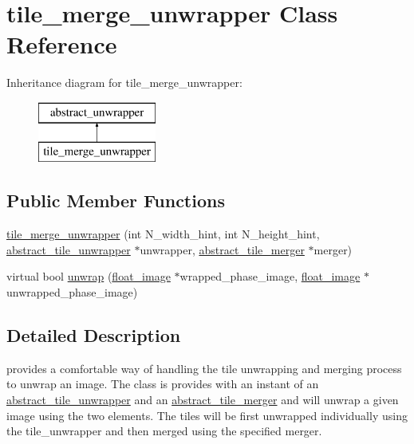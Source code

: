 \hypertarget{classtile__merge__unwrapper}{\section{tile\-\_\-merge\-\_\-unwrapper Class Reference}
\label{classtile__merge__unwrapper}
}
Inheritance diagram for tile\-\_\-merge\-\_\-unwrapper\-:\begin{figure}[H]
\begin{center}
\leavevmode
\includegraphics[height=2.000000cm]{classtile__merge__unwrapper}
\end{center}
\end{figure}
\subsection*{Public Member Functions}
\begin{DoxyCompactItemize}
\item 
\hyperlink{classtile__merge__unwrapper_ab070881e616ad7e72398aa6d019ea60e}{tile\-\_\-merge\-\_\-unwrapper} (int N\-\_\-width\-\_\-hint, int N\-\_\-height\-\_\-hint, \hyperlink{classabstract__tile__unwrapper}{abstract\-\_\-tile\-\_\-unwrapper} $\ast$unwrapper, \hyperlink{classabstract__tile__merger}{abstract\-\_\-tile\-\_\-merger} $\ast$merger)
\item 
virtual bool \hyperlink{classtile__merge__unwrapper_a30e5ac52c9edcd0356a37565fd955f6f}{unwrap} (\hyperlink{classfloat__image}{float\-\_\-image} $\ast$wrapped\-\_\-phase\-\_\-image, \hyperlink{classfloat__image}{float\-\_\-image} $\ast$unwrapped\-\_\-phase\-\_\-image)
\end{DoxyCompactItemize}


\subsection{Detailed Description}
provides a comfortable way of handling the tile unwrapping and merging process to unwrap an image. The class is provides with an instant of an \hyperlink{classabstract__tile__unwrapper}{abstract\-\_\-tile\-\_\-unwrapper} and an \hyperlink{classabstract__tile__merger}{abstract\-\_\-tile\-\_\-merger} and will unwrap a given image using the two elements. The tiles will be first unwrapped individually using the tile\-\_\-unwrapper and then merged using the specified merger. 

